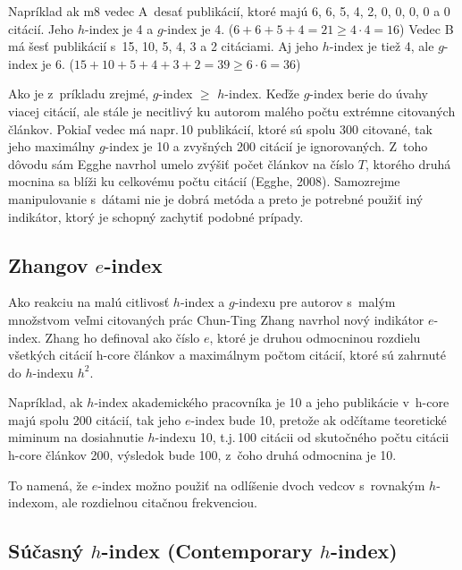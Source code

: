 Napríklad ak m8 vedec A~desať publikácií, ktoré majú 6, 6, 5, 4, 2, 0, 0, 0, 0 a
0 citácií.  Jeho $h$-index je 4 a $g$-index je 4.
($6+6+5+4 = 21 \geq 4\cdot4=16$) Vedec B má šesť publikácií s~15, 10, 5, 4, 3 a
2 citáciami.  Aj jeho $h$-index je tiež 4, ale $g$-index je 6.
($15+10+5+4+3+2 = 39 \geq 6\cdot6 = 36$)

Ako je z~príkladu zrejmé, $g$-index $\geq$ $h$-index.  Keďže $g$-index berie do
úvahy viacej citácií, ale stále je necitlivý ku autorom malého počtu extrémne
citovaných článkov.  Pokiaľ vedec má napr.\,10 publikácií, ktoré sú spolu 300
citované, tak jeho maximálny $g$-index je 10 a zvyšných 200 citácií je
ignorovaných.  Z~toho dôvodu sám Egghe navrhol umelo zvýšiť počet článkov na
číslo $T$, ktorého druhá mocnina sa blíži ku celkovému počtu citácií (Egghe,
2008).  Samozrejme manipulovanie s~dátami nie je dobrá metóda a preto je
potrebné použiť iný indikátor, ktorý je schopný zachytiť podobné prípady.


\subsection{Zhangov $e$-index}

Ako reakciu na malú citlivosť $h$-index a $g$-indexu pre autorov s~malým
množstvom veľmi citovaných prác Chun-Ting Zhang navrhol nový indikátor
$e$-index.  Zhang ho definoval ako číslo $e$, ktoré je druhou odmocninou
rozdielu všetkých citácií h-core článkov a maximálnym počtom citácií, ktoré sú
zahrnuté do $h$-indexu $h^2$. \citep{Zhang2009}

Napríklad, ak $h$-index akademického pracovníka je 10 a jeho publikácie v~h-core
majú spolu 200 citácií, tak jeho $e$-index bude 10, pretože ak odčítame
teoretické miminum na dosiahnutie $h$-indexu 10, t.j.\,100 citácii od skutočného
počtu citácii h-core článkov 200, výsledok bude 100, z~čoho druhá odmocnina je
10.

To namená, že $e$-index možno použiť na odlíšenie dvoch vedcov s~rovnakým
$h$-indexom, ale rozdielnou citačnou frekvenciou.


\subsection{Súčasný $h$-index (Contemporary $h$-index)}

